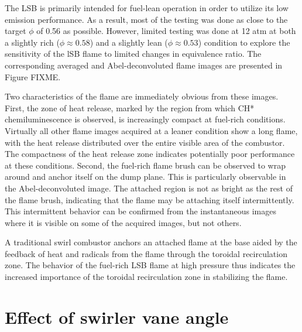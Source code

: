 The LSB is primarily intended for fuel-lean operation in order to utilize its low  emission performance.
As a result, most of the testing was done as close to the target \(\phi\) of 0.56 as possible.
However, limited testing was done at 12 atm at both a slightly rich (\(\phi \approx 0.58\)) and a slightly lean (\(\phi \approx 0.53\)) condition to explore the sensitivity of the lSB flame to limited changes in equivalence ratio.
The corresponding averaged and Abel-deconvoluted flame images are presented in Figure FIXME.

Two characteristics of the flame are immediately obvious from these images.
First, the zone of heat release, marked by the region from which CH* chemiluminescence is observed, is increasingly compact at fuel-rich conditions.
Virtually all other flame images acquired at a leaner condition show a long flame, with the heat release distributed over the entire visible area of the combustor.
The compactness of the heat release zone indicates potentially poor  performance at these conditions.
Second, the fuel-rich flame brush can be observed to wrap around and anchor itself on the dump plane.
This is particularly observable in the Abel-deconvoluted image.
The attached region is not as bright as the rest of the flame brush, indicating that the flame may be attaching itself intermittently.
This intermittent behavior can be confirmed from the instantaneous images where it is visible on some of the acquired images, but not others.

A traditional swirl combustor anchors an attached flame at the base aided by the feedback of heat and radicals from the flame through the toroidal recirculation zone.
The behavior of the fuel-rich LSB flame at high pressure thus indicates the increased importance of the toroidal recirculation zone in stabilizing the flame.

\section{Effect of swirler vane angle}

